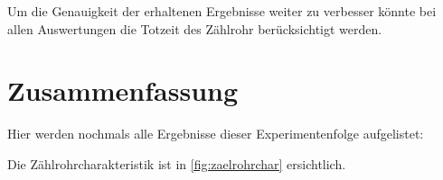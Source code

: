 \documentclass[12pt,english,ngerman]{scrartcl}
\begin{document}
Um die Genauigkeit der erhaltenen Ergebnisse weiter zu verbesser könnte bei
allen Auswertungen die Totzeit des Zählrohr berücksichtigt werden.

\newpage

\section{Zusammenfassung}

Hier werden nochmals alle Ergebnisse dieser Experimentenfolge aufgelistet:

\begin{table}[H]
	\caption[Erhaltene Zählraten bei verschiedenen Abschirmungsmaterialien]{
		Erhaltene
		Zählraten bei verschiedenen Abschirmungsmaterialien bei einer Torzeit von
		\SI{10}{\second} und einem Abstand der radioaktiven Quelle von \SI{15(2)}{\mm}.
		Zählraten sind exakt.                                                                                                              \\
		\(z_{Luft} \dots\) erhaltene Zählrate ohne Abschirmung                                                                             \\
		\(z_{\mathrm{Papier}} \dots\) erhaltene Zählrate mit einem Blatt Papier als Abschirmung                                    \\
		\(z_{\mathrm{Lineal}} \dots\) erhaltene Zählrate mit einem Lineal als Abschirmung, Dicke = \SI{2.1(0.05)}{\mm}             \\
		\(z_{\mathrm{CD}} \dots\) erhaltene Zählrate mit einer CD und zugehörigen Soulcase als Abschirmung                     \\
		\(z_{\mathrm{Alu \num{0.4}}} \dots\) erhaltene Zählrate mit mit einem Aluminiumblech als Abschirmung, Dicke = \SI{0.4(0.05)}{\mm} \\
		\(z_{\mathrm{Alu \num{0.8}}} \dots\) erhaltene Zählrate mit mit einem Aluminiumblech als Abschirmung, Dicke = \SI{0.8(0.05)}{\mm} \\
		\(z_{\mathrm{Alu \num{4}}} \dots\) erhaltene Zählrate mit mit einem Aluminiumblech als Abschirmung, Dicke = \SI{4.0(0.05)}{\mm} \\
	}
	\begin{center}
		
	\end{center}
\end{table}

Die Zählrohrcharakteristik ist in \autoref{fig:zaelrohrchar} ersichtlich.
\end{document}
